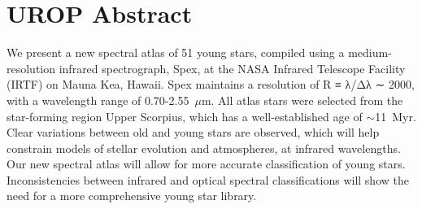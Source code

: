 \section{UROP Abstract}

We present a new spectral atlas of 51 young stars, compiled using a medium-resolution infrared spectrograph, Spex, at the NASA Infrared Telescope Facility (IRTF) on Mauna Kea, Hawaii.  
Spex maintains a resolution of R ≡ λ/Δλ ∼ 2000, with a wavelength range of 0.70-2.55~$\mu$m. 
All atlas stars were selected from the star-forming region Upper Scorpius, which has a well-established age of $\sim$11~Myr. Clear variations between old and young stars are observed, which will help constrain models of stellar evolution and atmospheres, at infrared wavelengths. Our new spectral atlas will allow for more accurate classification of young stars.  Inconsistencies between infrared and optical spectral classifications will show the need for a more comprehensive young star library.